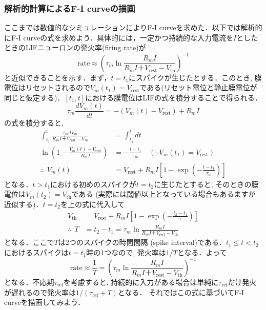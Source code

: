 \subsubsection{解析的計算によるF-I curveの描画}ここまでは数値的なシミュレーションによりF-I curveを求めた．以下では解析的にF-I curveの式を求めよう．具体的には，一定かつ持続的な入力電流を$I$としたときのLIFニューロンの発火率(firing rate)が
$$
\begin{equation}
\text{rate}\approx \left(\tau_m \ln \frac{R_mI}{R_mI＋V_\text{rest}-V_{\text{th}}}\right)^{-1}
\end{equation}
$$
と近似できることを示す．まず，$t=t_1$にスパイクが生じたとする．このとき, 膜電位はリセットされるので$V_m(t_1)=V_\text{rest}$である(リセット電位と静止膜電位が同じと仮定する)．$[t_1, t]$における膜電位はLIFの式を積分することで得られる．
$$
\begin{equation}
\tau_m \frac{dV_{m}(t)}{dt}=-(V_{m}(t)-V_\text{rest})+R_m I
\end{equation}
$$
の式を積分すると, 
$$
\begin{aligned}
\int_{t_1}^{t} \frac{\tau_m dV_m}{R_mI＋V_\text{rest}-V_m}&=\int_{t_1}^{t} dt\\
\ln \left(1-\frac{V_m(t)-V_\text{rest}}{R_mI}\right)&=-\frac{t-t_1}{\tau_m} \quad (\because V_m(t_1)=V_\text{rest})\\
\therefore\ \ V_m(t) &=V_\text{rest} + R_mI\left[1-\exp\left(-\frac{t-t_1}{\tau_m}\right)\right] 
\end{aligned}
$$
となる．$t>t_1$における初めのスパイクが$t=t_2$に生じたとすると, そのときの膜電位は$V_m(t_2)=V_{\text{th}}$である (実際には閾値以上となっている場合もあるますが近似する)．$t=t_2$を上の式に代入して
$$
\begin{align}
V_{\text{th}}&=V_\text{rest} + R_mI\left[1-\exp\left(-\frac{t_2-t_1}{\tau}\right)\right] \\
\therefore\ \ T&= t_2-t_1 = \tau_m \ln \frac{R_mI}{R_mI＋V_\text{rest}-V_{\text{th}}}
\end{align}
$$
となる．ここで$T$は2つのスパイクの時間間隔 (spike interval)である．$t_1\leq t<t_2$におけるスパイクは$t=t_1$時の1つなので, 発火率は$1/T$となる．よって
$$
\text{rate}\approx \frac{1}{T}=\left(\tau_m \ln \frac{R_mI}{R_mI＋V_\text{rest}-V_{\text{th}}}\right)^{-1}
$$
となる．不応期$\tau_{\text{ref}}$を考慮すると, 持続的に入力がある場合は単純に$\tau_{\text{ref}}$だけ発火が遅れるので発火率は$1/(\tau_{\text{ref}}+T)$となる．
それではこの式に基づいてF-I curveを描画してみよう．